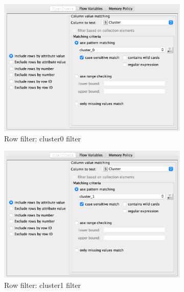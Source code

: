 \documentclass[11pt]{article}
\begin{document}
			\begin{figure}[H]
				\centering
				\begin{subfigure}{0.4\textwidth}
					\includegraphics[width=\textwidth]{res/t1/t14/t14-row-filter-1-conf}
					\caption{Row filter: cluster0 filter}
					\label{fig:first}
				\end{subfigure}
				\hfill
				\begin{subfigure}{0.4\textwidth}
					\includegraphics[width=\textwidth]{res/t1/t14/t14-row-filter-2-conf}
					\caption{Row filter: cluster1 filter}
					\label{fig:second}
				\end{subfigure}
				\hfill
				\begin{subfigure}{0.4\textwidth}

\end{subfigure}
\end{figure}
\end{document}
